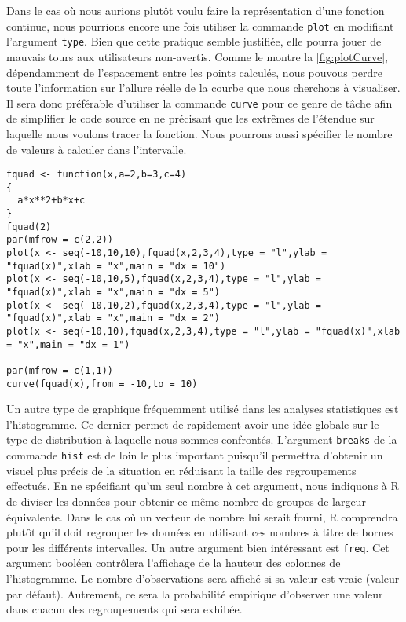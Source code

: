 \vspace{\baselineskip}
Dans le cas où nous aurions plutôt voulu faire la représentation d'une fonction continue, nous pourrions encore une fois utiliser la commande \texttt{plot} en modifiant l'argument \texttt{type}. Bien que cette pratique semble justifiée, elle pourra jouer de mauvais tours aux utilisateurs non-avertis. Comme le montre la \autoref{fig:plotCurve}, dépendamment de l'espacement entre les points calculés, nous pouvous perdre toute l'information sur l'allure réelle de la courbe que nous cherchons à visualiser. \\

Il sera donc préférable d'utiliser la commande \texttt{curve} \cite{Rfunction:curve} pour ce genre de tâche afin de simplifier le code source en ne précisant que les extrêmes de l'étendue sur laquelle nous voulons tracer la fonction. Nous pourrons aussi spécifier le nombre de valeurs à calculer dans l'intervalle. \\

\begin{lstlisting}[caption = Utilisation de la commande \texttt{curve},label=src:plotCurve]
fquad <- function(x,a=2,b=3,c=4)
{
  a*x**2+b*x+c
}
fquad(2)
par(mfrow = c(2,2))
plot(x <- seq(-10,10,10),fquad(x,2,3,4),type = "l",ylab = "fquad(x)",xlab = "x",main = "dx = 10")
plot(x <- seq(-10,10,5),fquad(x,2,3,4),type = "l",ylab = "fquad(x)",xlab = "x",main = "dx = 5")
plot(x <- seq(-10,10,2),fquad(x,2,3,4),type = "l",ylab = "fquad(x)",xlab = "x",main = "dx = 2")
plot(x <- seq(-10,10),fquad(x,2,3,4),type = "l",ylab = "fquad(x)",xlab = "x",main = "dx = 1")

par(mfrow = c(1,1))
curve(fquad(x),from = -10,to = 10)
\end{lstlisting}



\vspace{\baselineskip}
Un autre type de graphique fréquemment utilisé dans les analyses statistiques est l'histogramme. Ce dernier permet de rapidement avoir une idée globale sur le type de distribution à laquelle nous sommes confrontés. L'argument \texttt{breaks} de la commande \texttt{hist} \cite{Rfunction:hist} est de loin le plus important puisqu'il permettra d'obtenir un visuel plus précis de la situation en réduisant la taille des regroupements effectués. En ne spécifiant qu'un seul nombre à cet argument, nous indiquons à R de diviser les données pour obtenir ce même nombre de groupes de largeur équivalente. Dans le cas où un vecteur de nombre lui serait fourni, R comprendra plutôt qu'il doit regrouper les données en utilisant ces nombres à titre de bornes pour les différents intervalles. Un autre argument bien intéressant est \texttt{freq}. Cet argument booléen contrôlera l'affichage de la hauteur des colonnes de l'histogramme. Le nombre d'observations sera affiché si sa valeur est vraie (valeur par défaut). Autrement, ce sera la probabilité empirique d'observer une valeur dans chacun des regroupements qui sera exhibée. \\

